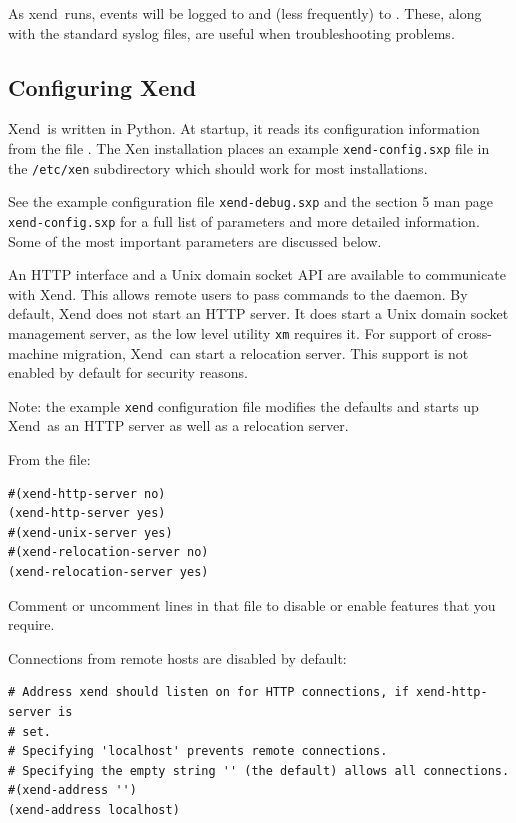 \documentclass[11pt,twoside,final,openright]{report}
\def\Xend{{Xend}\xspace}
\def\xend{{xend}\xspace}
\begin{document}
As \xend\ runs, events will be logged to  and
(less frequently) to . These, along with
the standard syslog files, are useful when troubleshooting problems.

\subsection{Configuring \Xend\ }

\Xend\ is written in Python. At startup, it reads its configuration
information from the file . The Xen
installation places an example \texttt{xend-config.sxp} file in the
\texttt{/etc/xen} subdirectory which should work for most installations.

See the example configuration file \texttt{xend-debug.sxp} and the
section 5 man page \texttt{xend-config.sxp} for a full list of
parameters and more detailed information. Some of the most important
parameters are discussed below.

An HTTP interface and a Unix domain socket API are available to
communicate with \Xend. This allows remote users to pass commands to the
daemon. By default, \Xend does not start an HTTP server. It does start a
Unix domain socket management server, as the low level utility
\texttt{xm} requires it. For support of cross-machine migration, \Xend\
can start a relocation server. This support is not enabled by default
for security reasons.

Note: the example \texttt{xend} configuration file modifies the defaults and
starts up \Xend\ as an HTTP server as well as a relocation server.

From the file:

\begin{verbatim}
#(xend-http-server no)
(xend-http-server yes)
#(xend-unix-server yes)
#(xend-relocation-server no)
(xend-relocation-server yes)
\end{verbatim}

Comment or uncomment lines in that file to disable or enable features
that you require.

Connections from remote hosts are disabled by default:

\begin{verbatim}
# Address xend should listen on for HTTP connections, if xend-http-server is
# set.
# Specifying 'localhost' prevents remote connections.
# Specifying the empty string '' (the default) allows all connections.
#(xend-address '')
(xend-address localhost)
\end{verbatim}
\end{document}
